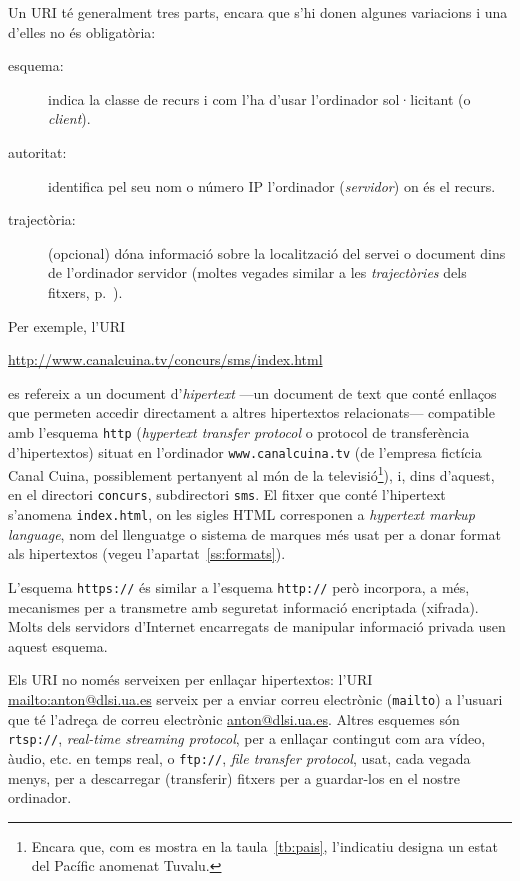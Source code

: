 Un URI té generalment tres parts, encara que s'hi donen algunes
variacions i una d'elles no és obligatòria:
\begin{description}
\item[esquema:] indica la classe de recurs i com l'ha d'usar
  l'ordinador sol·licitant (o \emph{client}).
\item[autoritat:] identifica pel seu nom o número IP l'ordinador
  (\emph{servidor}) on és el recurs.
\item[trajectòria:] (opcional) dóna informació sobre la localització
  del servei o document dins de l'ordinador servidor (moltes vegades
  similar a les \emph{trajectòries} dels fitxers,
  p.~\pageref{pg:fitxer}).
\end{description}
Per exemple, l'URI
\begin{center}
\url{http://www.canalcuina.tv/concurs/sms/index.html}
\end{center}
es refereix a un document d'\emph{hipertext} ---un document de text
que conté enllaços que permeten accedir directament a altres
hipertextos relacionats--- compatible amb l'esquema \texttt{http}
(\emph{hypertext transfer protocol} o protocol de transferència
d'hipertextos) situat en l'ordinador \texttt{www.canalcuina.tv} (de
l'empresa fictícia Canal Cuina, possiblement pertanyent al món de la
televisió\footnote{Encara que, com es mostra en la
  taula~\ref{tb:pais}, l'indicatiu designa un estat del Pacífic
  anomenat Tuvalu.}), i, dins d'aquest, en el directori
\texttt{concurs}, subdirectori \texttt{sms}. El fitxer que conté
l'hipertext s'anomena \texttt{index.html}, on les sigles HTML
corresponen a \emph{hypertext markup language}, nom del llenguatge o
sistema de marques més usat per a donar format als hipertextos (vegeu
l'apartat~\ref{ss:formats}).

L'esquema {\tt https://} és similar a l'esquema {\tt http://} però
incorpora, a més, mecanismes per a transmetre amb seguretat informació
encriptada (xifrada). Molts dels servidors d'Internet encarregats de
manipular informació privada usen aquest esquema.

Els URI no només serveixen per enllaçar hipertextos: l'URI
\url{mailto:anton@dlsi.ua.es} serveix per a enviar correu electrònic
(\texttt{mailto}) a l'usuari que té l'adreça de correu electrònic
\url{anton@dlsi.ua.es}. Altres esquemes són \texttt{rtsp://},
\emph{real-time streaming protocol}, per a enllaçar contingut com ara
vídeo, àudio, etc. en temps real, o {\tt ftp://}, \emph{file transfer
  protocol}, usat, cada vegada menys, per a descarregar (transferir)
fitxers per a guardar-los en el nostre ordinador\label{pg:ftp}.

